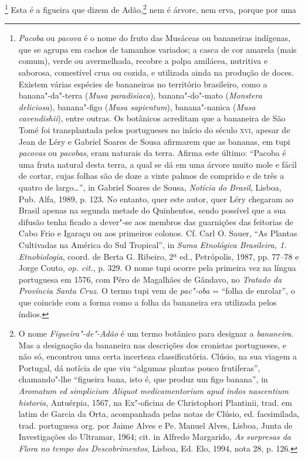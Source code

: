 \footnote{ \textit{Pacoba} ou \textit{pacova} é o
nome do fruto das Musáceas ou bananeiras indígenas, que se agrupa em
cachos de tamanhos variados; a casca de cor amarela (mais comum), verde
ou avermelhada, recobre a polpa amilácea, nutritiva e saborosa,
comestível crua ou cozida, e utilizada ainda na produção de doces.
Existem várias espécies de bananeiras no território brasileiro, como a
banana"-da"-terra (\textit{Musa paradisiaca}), banana"-do"-mato
(\textit{Monstera deliciosa}), banana"-figo (\textit{Musa sapientum}), 
banana"-nanica (\textit{Musa cavendishii}), entre outras. Os botânicos
acreditam que a bananeira de São Tomé foi transplantada pelos
portugueses no início do século \textsc{xvi}, apesar de Jean de Léry e Gabriel
Soares de Sousa afirmarem que as bananas, em tupi \textit{pacovas} ou
\textit{pacobas}, eram naturais da terra. Afirma este último: ``Pacoba é
uma fruta natural desta terra, a qual se dá em uma árvore muito mole e
fácil de cortar, cujas folhas são de doze a vinte palmos de comprido e
de três a quatro de largo\ldots{}'', in Gabriel Soares de Sousa,
\textit{Notícia do Brasil}, Lisboa, Pub. Alfa, 1989, p. 123. No
entanto, quer este autor, quer Léry chegaram ao Brasil apenas na
segunda metade do Quinhentos, sendo possível que a sua difusão tenha
ficado a dever"-se aos membros das guarnições das feitorias de Cabo Frio
e Igaraçu ou aos primeiros colonos. Cf. Carl O. Sauer, ``As Plantas
Cultivadas na América do Sul Tropical'', in \textit{Suma Etnológica
Brasileira, 1. Etnobiologia}, coord. de Berta G. Ribeiro, 2ª ed.,
Petrópolis, 1987, pp. 77--78 e Jorge Couto, \textit{op. cit.}, p. 329. O
nome tupi ocorre pela primeira vez na língua portuguesa em 1576, com
Pêro de Magalhães de Gândavo, no \textit{Tratado da Província Santa Cruz.}
O termo tupi vem de \textit{pac"-oba} = ``folha de enrolar'', o que
coincide com a forma como a folha da bananeira era utilizada pelos
índios.} Esta é a figueira que dizem de Adão,\footnote{ O
nome \textit{Figueira"-de"-Adão} é um termo botânico para designar a
\textit{bananeira.} Mas a designação da bananeira nas descrições dos
cronistas portugueses, e não só, encontrou uma certa incerteza
classificatória. Clúsio, na sua viagem a Portugal, dá notícia de que
viu ``algumas plantas pouco frutíferas'', chamando"-lhe ``figueira bana,
isto é, que produz um figo banana'', in \textit{Aromatum ed simplicium
Aliquot medicamentorium apud indos nascentium historia}, Antuérpia,
1567, na Ex"-oficina de Christophori Plantinii, trad. em latim de Garcia
da Orta, acompanhada pelas notas de Clúsio, ed. facsimilada, trad.
portuguesa org. por Jaime Alves e Pe. Manuel Alves, Lisboa, Junta de
Investigações do Ultramar, 1964; cit. in Alfredo Margarido, \textit{As
surpresas da Flora no tempo dos Descobrimentos}, Lisboa, Ed. Elo, 1994,
nota 28, p. 126.} nem é árvore, nem erva, porque por uma
